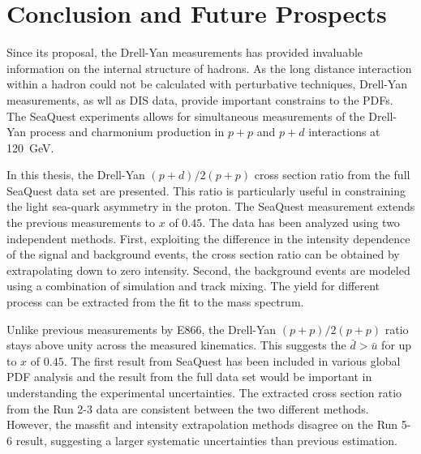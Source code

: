 \documentclass[../main.tex]{subfiles}
\begin{document}
\ifSubfilesClassLoaded{
	\mainmatter
	\setcounter{chapter}{5}
}{}

\chapter{Conclusion and Future Prospects}
\label{ch:conclusion}
Since its proposal, the Drell-Yan measurements has provided invaluable information
on the internal structure of hadrons. As the long distance interaction within a
hadron could not be calculated with perturbative techniques, Drell-Yan measurements,
as wll as DIS data, provide important constrains to the PDFs. 
The SeaQuest experiments allows for simultaneous measurements of the Drell-Yan process
and charmonium production in $p+p$ and $p+d$ interactions at \SI{120}{\GeV}.

In this thesis, the Drell-Yan $(p+d)/2(p+p)$ cross section ratio from the full
SeaQuest data set are presented. This ratio is particularly useful in constraining
the light sea-quark asymmetry in the proton. The SeaQuest measurement extends the
previous measurements to $x$ of $0.45$.
The data has been analyzed using two independent methods. First, exploiting the
difference in the intensity dependence of the signal and background events, the
cross section ratio can be obtained by extrapolating down to zero intensity.
Second, the background events are modeled using a combination of simulation and
track mixing. The yield for different process can be extracted from the fit to
the mass spectrum.

Unlike previous measurements by E866, the  Drell-Yan $(p+p)/2(p+p)$ ratio
stays above unity across the measured kinematics. This suggests the $\bar{d}>\bar{u}$
for up to $x$ of $0.45$.
The first result from SeaQuest has been included in various global PDF analysis
and the result from the full data set would be important in understanding the
experimental uncertainties. The extracted cross section ratio from the Run 2-3
data are consistent between the two different methods. However, the massfit
and intensity extrapolation methods disagree on the Run 5-6 result,
suggesting a larger systematic uncertainties than previous estimation.
\end{document}
